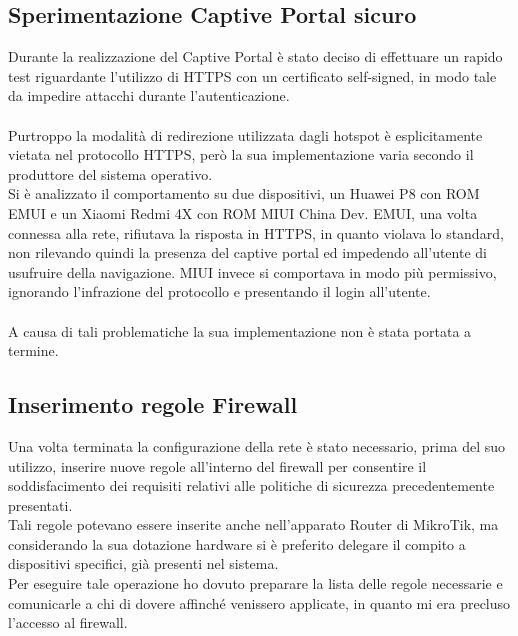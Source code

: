 \documentclass[Realizzazione.tex]{subfiles}
\begin{document}
\subsection{Sperimentazione Captive Portal sicuro}
Durante la realizzazione del Captive Portal è stato deciso di effettuare un rapido test riguardante l'utilizzo di HTTPS con un certificato self-signed, in modo tale da impedire attacchi  durante l'autenticazione. \\\\
Purtroppo la modalità di redirezione utilizzata dagli hotspot è esplicitamente vietata nel protocollo HTTPS, però la sua implementazione varia secondo il produttore del sistema operativo. \\
Si è analizzato il comportamento su due dispositivi, un Huawei P8 con ROM EMUI e un Xiaomi Redmi 4X con ROM MIUI China Dev. EMUI, una volta connessa alla rete, rifiutava la risposta in HTTPS, in quanto violava lo standard, non rilevando quindi la presenza del captive portal ed impedendo all'utente di usufruire della navigazione. MIUI invece si comportava in modo più permissivo, ignorando l'infrazione del protocollo e presentando il login all'utente.\\\\
A causa di tali problematiche la sua implementazione non è stata portata a termine.

\subsection{Inserimento regole Firewall} 
Una volta terminata la configurazione della rete è stato necessario, prima del suo utilizzo, inserire nuove regole all'interno del firewall per consentire il soddisfacimento dei requisiti relativi alle politiche di sicurezza precedentemente presentati. \\
Tali regole potevano essere inserite anche nell'apparato Router di MikroTik, ma considerando la sua dotazione hardware si è preferito delegare il compito a dispositivi specifici, già presenti nel sistema. \\
Per eseguire tale operazione ho dovuto preparare la lista delle regole necessarie e comunicarle a chi di dovere affinché venissero applicate, in quanto mi era precluso l'accesso al firewall.
\end{document}
